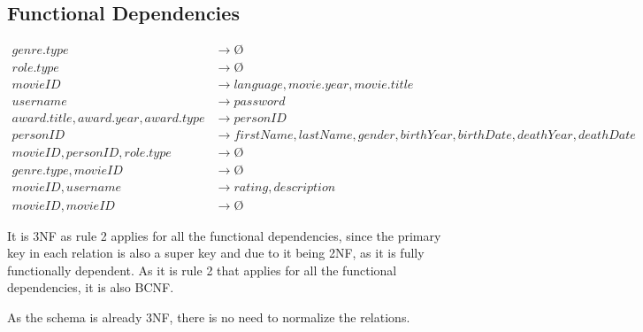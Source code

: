 \documentclass[10pt,a4paper,final]{report}
\begin{document}
\subsection*{Functional Dependencies}

\begin{equation*}
\begin{aligned}
     genre.type &\rightarrow Ø \\
     role.type &\rightarrow Ø \\
     movieID &\rightarrow language, movie.year, movie.title\\
     username  &\rightarrow password \\
     award.title, award.year, award.type &\rightarrow  personID\\
     personID &\rightarrow firstName, lastName, gender, birthYear, birthDate, deathYear, deathDate \\
     movieID, personID, role.type &\rightarrow  Ø \\
     genre.type, movieID &\rightarrow Ø \\     
     movieID, username &\rightarrow rating, description\\
     movieID, movieID &\rightarrow Ø
\end{aligned}
\end{equation*}

It is 3NF as rule 2 applies for all the functional dependencies, since the primary key in each relation is also a super key and due to it being 2NF, as it is fully functionally dependent.
As it is rule 2 that applies for all the functional dependencies, it is also BCNF.

As the schema is already 3NF, there is no need to normalize the relations.
\end{document}
